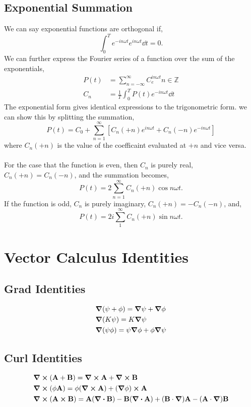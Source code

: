 \documentclass{book}
\begin{document}
\section{Exponential Summation}
We can say exponential functions are orthogonal if,
\begin{equation}
	\int_0^T e^{-in\omega t}e^{in\omega t}\dd{t} = 0.
\end{equation}
We can further express the Fourier series of a function over the sum of the exponentials,
\begin{align}
	P(t) & = \sum_{n=-\infty}^{\infty}C_e^{in\omega t} n \in \mathbb{Z} \\
	C_n & = \frac{1}{T} \int_0^TP(t)e^{-in\omega t}\dd{t} \label{C}
\end{align}
The exponential form gives identical expressions to the trigonometric form. we can show this by splitting the summation,
\begin{equation}
	P(t) = C_0 + \sum_{n=1}^{\infty}\left[C_n(+n)e^{in\omega t} + C_n(-n)e^{-in\omega t}\right]
\end{equation} 
where $C_n(+n)$ is the value of the coefficaint evaluated at $+n$ and vice versa. 
\\\\
For the case that the function is even, then $C_n$ is purely real, $C_n(+n) = C_n(-n)$, and the summation becomes,
\begin{equation}
	P(t) = 2\sum_{n=1}^{\infty}C_n(+n)\cos{n\omega t}.
\end{equation}
If the function is odd, $C_n$ is purely imaginary, $C_n(+n) = -C_n(-n)$, and,
\begin{equation}
	P(t) = 2i\sum_1^{\infty}C_n(+n)\sin n\omega t.
\end{equation}
\appendix
 \chapter{Vector Calculus Identities}
\section{Grad Identities}
\begin{align}
    & \grad(\psi + \phi) = \grad\psi + \grad\phi \\
    & \grad(K\psi) = K\grad\psi \\
    & \grad(\psi\phi) = \psi\grad\phi + \phi\grad\psi 
\end{align}
\section{Curl Identities}
\begin{align}
    & \curl{(\vb{A}+\vb{B})} = \curl{\vb{A}} + \curl{\vb{B}} \\
    & \curl{(\phi\vb{A})} = \phi(\curl{\vb{A}})+(\grad\phi)\cross\vb{A} \\
    & \curl{(\vb{A}\cross\vb{B})} = \vb{A}(\div{\vb{B}})-\vb{B}(\div{\vb{A}})+(\vb{B}\cdot\grad)\vb{A}-(\vb{A}\cdot\grad)\vb{B}
\end{align}
\end{document}
